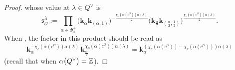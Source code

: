 \begin{proof}
whose value at $\lambda\in Q^\vee$ is
\[
\mathfrak{s}^\lambda_\mathcal{O}:=\prod_{\alpha\in\Phi_0^+}\bigl(\mathbf{k}_{\alpha}\mathbf{k}_{(\alpha,1)}\bigr)^{-\frac{\chi_e(\alpha(c^\mathcal{O}))\alpha(\lambda)}{2}}
\bigl(\mathbf{k}_{\frac{\alpha}{2}}\mathbf{k}_{(\frac{\alpha}{2},\frac{1}{2})}\bigr)^{\frac{\chi_o(\alpha(c^\mathcal{O}))\alpha(\lambda)}{2}}.
\]
When , the factor in this product should be read as
\[
\mathbf{k}_\alpha^{-\chi_e(\alpha(c^\mathcal{O}))\alpha(\lambda)}\,\mathbf{k}_{\frac{\alpha}{2}}^{\chi_o(\alpha(c^\mathcal{O}))\alpha(\lambda)}=
\mathbf{k}_{\alpha}^{(\chi_o(\alpha(c^\mathcal{O}))-\chi_e(\alpha(c^\mathcal{O})))\alpha(\lambda)}
\]
\big(recall that  when $\alpha\smash{\bigl(Q^\vee\bigr)}=\mathbb{Z}$\big).


\end{proof}
